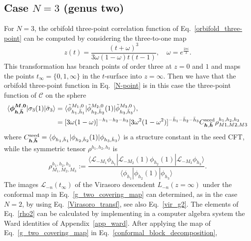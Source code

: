 \documentclass[a4paper,11pt]{article}
\begin{document}
\subsection{Case $N=3$ (genus two)}\label{sec:genus_two}

For $N=3$, the orbifold three-point correlation 
function of Eq.~\eqref{orbifold_three-point} can be computed 
by considering the three-to-one map~\cite{Collier}
\begin{equation}\label{g_two_covering_map}
 z(t) =\frac{(t+\omega)^3}{3\omega(1-\omega)t(t-1)},\quad \omega=e^{\frac{2\pi i}{3}}.
\end{equation}
This transformation has branch points of order three at 
$z=0$ and $1$ and maps the points $t_{\infty}=\{0, 1, \infty\}$ in the $t$-surface into $z=\infty$. 
Then we have that the orbifold three-point function in Eq.~\eqref{N-point} is in this case the three-point 
function of $\mathcal{C}$ on the sphere
\begin{align}\label{C_3_X}
 \langle \boldsymbol{\phi}^{\boldsymbol{M}, \boldsymbol{0}}_{\boldsymbol{h}, \boldsymbol{\bar{h}}}|\sigma_{3}(1)|\bar{\sigma}_{3}\rangle &=\langle \tilde{\phi}_{h_1,\bar{h}_1}^{M_1,0}|\tilde{\phi}_{h_2,\bar{h}_2}^{M_2,0}(1)|\tilde{\phi}_{h_3,\bar{h}_3}^{M_3,0}\rangle,
 \nonumber \\
 &=[3\omega(1-\omega)]^{-h_1-h_2-h_3}[3\omega^2(1-\omega^2)]^{-\bar{h}_1-\bar{h}_2-\bar{h}_3}C_{\boldsymbol{h}, \boldsymbol{\bar{h}}}^{{\rm seed}}\rho_{M1,M2,M3}^{h_1,h_2,h_3}
\end{align}
where $C_{\boldsymbol{h},\boldsymbol{\bar{h}}}^{{\rm seed}}=\langle \phi_{h_1, \bar{h}_1}|\phi_{h_2,\bar{h}_2}(1)|\phi_{h_3,\bar{h}_3}\rangle$ is a structure constant in the seed CFT, while the symmetric tensor $\rho^{h_1,h_2,h_3}$ is 
\begin{equation}
\label{rho2}
 \rho^{h_1,h_2,h_3}_{M_1,M_2,M_3}:=
 \frac{\langle \mathcal{L}_{-M_1}\phi_{h_1}|\mathcal{L}_{-M_2}(1)\phi_{h_2}(1)|\mathcal{L}_{-M_3}\phi_{h_3}\rangle}
 { \langle \phi_{h_1}|\phi_{h_2}(1)|\phi_{h_3}\rangle}.
\end{equation}
The images $\mathcal{L}_{-n}(t_{\infty})$ of the Virasoro descendent $L_{-n}(z=\infty)$ 
under the conformal map in Eq.~\eqref{g_two_covering_map} can determined, as in the 
case $N=2$, by using Eq.~\eqref{Virasoro_transf}, see also Eq.~\eqref{vir_g2}.
The elements of Eq.~\eqref{rho2} can be calculated by implementing in a computer 
algebra system the Ward identities of Appendix~\ref{app_ward}. After applying the 
map of Eq.~\eqref{g_two_covering_map} in Eq.~\eqref{conformal_block_decomposition},
\end{document}
